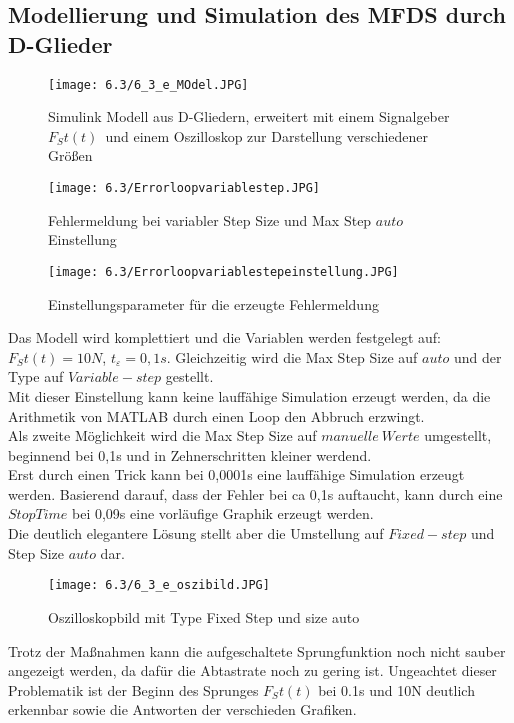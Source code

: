 \documentclass[12pt,a4paper]{scrartcl}	%
\begin{document}
\subsection{Modellierung und Simulation des MFDS durch D-Glieder}
\begin{figure}[bht]
	\centering
	\texttt{[image: 6.3/6\_3\_e\_MOdel.JPG]}
	\caption[Simulink Modell aus D-Glieder]{Simulink Modell aus D-Gliedern, erweitert mit einem Signalgeber $F_St(t)$~und einem Oszilloskop zur Darstellung verschiedener Größen}
\end{figure}
\begin{figure}[bht]
	\centering
	\texttt{[image: 6.3/Errorloopvariablestep.JPG]}
	\caption{Fehlermeldung bei variabler Step Size und Max Step $auto$ Einstellung}
\end{figure}
\begin{figure}[tbh]
	\centering
	\texttt{[image: 6.3/Errorloopvariablestepeinstellung.JPG]}
	\caption{Einstellungsparameter für die erzeugte Fehlermeldung}
\end{figure}
Das Modell wird komplettiert und die Variablen werden festgelegt auf:
$F_St(t)=10N$, $t_\varepsilon=0,1s$. Gleichzeitig wird die Max Step Size auf $auto$ und der Type auf $Variable-step$ gestellt.\\
Mit dieser Einstellung kann keine lauffähige Simulation erzeugt werden, da die Arithmetik von MATLAB durch einen Loop den Abbruch erzwingt.\\
Als zweite Möglichkeit wird die Max Step Size auf $manuelle~Werte$ umgestellt, beginnend bei 0,1s und in Zehnerschritten kleiner werdend.\\ Erst durch einen Trick kann bei 0,0001s eine lauffähige Simulation erzeugt werden. Basierend darauf, dass der Fehler bei ca 0,1s auftaucht, kann durch eine $Stop Time$ bei 0,09s eine vorläufige Graphik erzeugt werden.\\
Die deutlich elegantere Lösung stellt aber die Umstellung auf $Fixed-step$ und Step Size $auto$ dar.\\
\begin{figure}[tbh]
	\centering
	\texttt{[image: 6.3/6\_3\_e\_oszibild.JPG]}
	\caption{Oszilloskopbild mit Type Fixed Step und size auto}
\end{figure}
Trotz der Maßnahmen kann die aufgeschaltete Sprungfunktion  noch nicht sauber angezeigt werden, da dafür die Abtastrate noch zu gering ist. 
Ungeachtet dieser Problematik ist der Beginn des Sprunges $F_St(t)$ bei 0.1s und 10N deutlich erkennbar sowie die Antworten der verschieden Grafiken.
\end{document}
